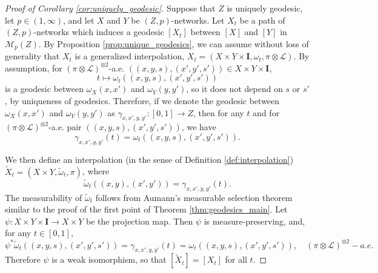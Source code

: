 \documentclass{article}
\theoremstyle{definition}
\newcommand{\M}{\mathcal{M}}
\newcommand{\MZp}{\M_p(Z)}
\begin{document}
\begin{proof}[Proof of Corollary \ref{cor:uniquely_geodesic}]
    Suppose that $Z$ is uniquely geodesic, let $p \in (1,\infty)$, and let $X$ and $Y$ be $(Z,p)$-networks. Let $X_t$ be a path of $(Z,p)$-networks which induces a geodesic $[X_t]$ between $[X]$ and $[Y]$ in $\MZp$. By Proposition \ref{prop:unique_geodesics}, we can assume without loss of generality that $X_t$ is a generalized interpolation, $X_t = (X \times Y \times \mathbf{I}, \omega_t, \pi \otimes \mathscr{L})$. By assumption, for $(\pi\otimes \mathscr{L})^{\otimes 2}$-a.e. $((x,y,s),(x',y',s'))\in X\times Y \times \mathbf{I}$, 
    \[
    t \mapsto \omega_t((x,y,s),(x',y',s'))
    \]
    is a geodesic between $\omega_X(x,x')$ and $\omega_Y(y,y')$, so it does not depend on $s$ or $s'$, by uniqueness of geodesics. Therefore, if we denote the geodesic between $\omega_X(x,x')$ and $\omega_Y(y,y')$ as $\gamma_{x,x',y,y'}:[0,1]\to Z$, then for any $t$ and for $(\pi\otimes \mathscr{L})^{\otimes 2}$-a.e. pair $((x,y,s),(x',y',s'))$, we have 
    \begin{equation}
        \gamma_{x,x',y,y'}(t) = \omega_t((x,y,s),(x',y',s')).
    \end{equation}
    
    We then define an interpolation (in the sense of Definition \ref{def:interpolation}) $\widetilde{X}_t = (X \times Y, \widetilde{\omega}_t, \pi)$, where 
    \[
    \widetilde{\omega}_t((x,y),(x',y')) = \gamma_{x,x',y,y'}(t).
    \]
    The measurability of $\tilde{\omega}_t$ follows from Aumann's measurable selection theorem \cite[Theorem B.9]{serieys2026nonlinear} similar to the proof of the first point of Theorem \ref{thm:geodesics_main}.
    Let $\psi:X \times Y \times \mathbf{I} \to X \times Y$ be the projection map. Then $\psi$ is measure-preserving, and, for any $t \in [0,1]$, 
    \[
    \psi^\ast \widetilde{\omega}_t((x,y,s),(x',y',s')) = \gamma_{x,x',y,y'}(t) = \omega_t((x,y,s),(x',y',s')), \quad (\pi\otimes \mathscr{L})^{\otimes 2}-a.e.
    \]
    Therefore $\psi$ is a weak isomorphism, so that $[\widetilde{X}_t] = [X_t]$ for all $t$.
\end{proof}
\end{document}
